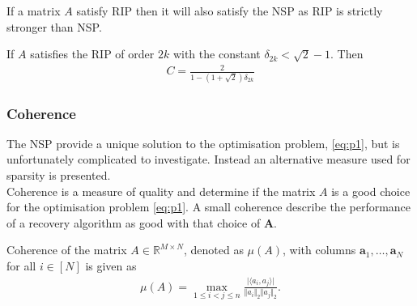 If a matrix $A$ satisfy RIP then it will also satisfy the NSP as RIP is strictly stronger than NSP.
\begin{theorem}
If $A$ satisfies the RIP of order $2k$ with the constant $\delta_{2k} < \sqrt{2} -1$. Then
\begin{align*}
C = \frac{2}{1 - (1 + \sqrt{2}) \delta_{2k}}
\end{align*}
\end{theorem} 

\subsubsection{Coherence}
The NSP provide a unique solution to the optimisation problem, \eqref{eq:p1}, but is unfortunately complicated to investigate. Instead an alternative measure used for sparsity is presented.
\\%
Coherence is a measure of quality and determine if the matrix $A$ is a good choice for the optimisation problem \eqref{eq:p1}. A small coherence describe the performance of a recovery algorithm as good with that choice of $\mathbf{A}$. 
\begin{definition}[Coherence]
Coherence of the matrix $A \in \mathbb{R}^{M \times N}$, denoted as $\mu (A)$, with columns $\mathbf{a}_1, \dots, \mathbf{a}_N$ for all $i \in [N]$ is given as
\begin{align*}
\mu (A) = \max_{1 \leq i < j \leq n} \frac{\vert \langle a_i, a_j \rangle \vert}{\Vert a_i \Vert_2 \Vert a_j \Vert_2}.
\end{align*}
\end{definition}